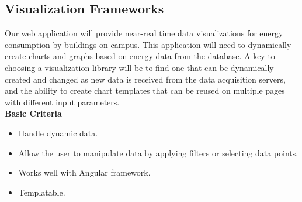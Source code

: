 \subsection{Visualization Frameworks}
Our web application will provide near-real time data visualizations for energy consumption by buildings on campus. This application will need to dynamically create charts and graphs based on energy data from the database. A key to choosing a visualization library will be to find one that can be dynamically created and changed as new data is received from the data acquisition servers, and the ability to create chart templates that can be reused on multiple pages with different input parameters.\\
\textbf{Basic Criteria}
\begin{itemize}
\item Handle dynamic data. 
\item Allow the user to manipulate data by applying filters or selecting data points. 
\item Works well with Angular framework.
\item Templatable.
\end{itemize}
